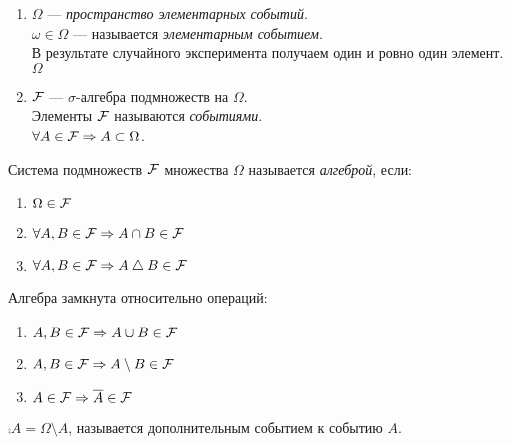 \begin{enumerate}[label=\protect\circled{\arabic*},series=kolm_triple]

\item
	$\Omega$ --- \emph{пространство элементарных событий}.\\
	$\omega \in \Omega$ --- называется \emph{элементарным событием}.\\
	В результате случайного эксперимента получаем один и ровно один элемент. $\Omega$

\item
	$\mathcal{F}$ --- $\sigma$-алгебра подмножеств на $\Omega$.\\
	Элементы $\mathcal{F}$ называются \emph{событиями}.\\
	$\forall A \in \mathcal{F} \Rightarrow A \subset \Omega$.

\end{enumerate}

\begin{definition}
	Система подмножеств $\mathcal{F}$ множества $\Omega$ называется \emph{алгеброй}, если:

	\begin{enumerate}
		\item $\Omega \in \mathcal{F}$
		\item $\forall A,B \in \mathcal{F} \Rightarrow A \cap B \in \mathcal{F}$
		\item $\forall A,B \in \mathcal{F} \Rightarrow A \bigtriangleup B \in \mathcal{F}$\\
	\end{enumerate}

\end{definition}

\begin{exercise}
	Алгебра замкнута относительно операций:
	\begin{enumerate}
		\item $A, B \in \mathcal{F} \Rightarrow A \cup B \in \mathcal{F}$
		\item $A, B \in \mathcal{F} \Rightarrow A \setminus B \in \mathcal{F}$
		\item $A \in \mathcal{F} \Rightarrow \overline{A} \in \mathcal{F}$\\
	\end{enumerate}
\end{exercise}

\begin{definition}
 	$\comp{A} = \Omega \setminus A$, называется дополнительным событием к событию $A$.\\
\end{definition}

